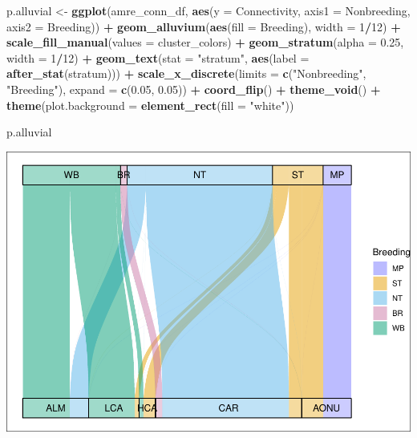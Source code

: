 \documentclass[
]{book}
\newenvironment{Shaded}{\begin{snugshade}}{\end{snugshade}}
\newcommand{\AttributeTok}[1]{\textcolor[rgb]{0.13,0.29,0.53}{#1}}
\newcommand{\DecValTok}[1]{\textcolor[rgb]{0.00,0.00,0.81}{#1}}
\newcommand{\FloatTok}[1]{\textcolor[rgb]{0.00,0.00,0.81}{#1}}
\newcommand{\FunctionTok}[1]{\textcolor[rgb]{0.13,0.29,0.53}{\textbf{#1}}}
\newcommand{\NormalTok}[1]{#1}
\newcommand{\OtherTok}[1]{\textcolor[rgb]{0.56,0.35,0.01}{#1}}
\newcommand{\SpecialCharTok}[1]{\textcolor[rgb]{0.81,0.36,0.00}{\textbf{#1}}}
\newcommand{\StringTok}[1]{\textcolor[rgb]{0.31,0.60,0.02}{#1}}
\begin{document}
\begin{Shaded}
\begin{Highlighting}[]
\NormalTok{p.alluvial }\OtherTok{\textless{}{-}} \FunctionTok{ggplot}\NormalTok{(amre\_conn\_df,}
       \FunctionTok{aes}\NormalTok{(}\AttributeTok{y =}\NormalTok{ Connectivity, }\AttributeTok{axis1 =}\NormalTok{ Nonbreeding, }\AttributeTok{axis2 =}\NormalTok{ Breeding)) }\SpecialCharTok{+}
  \FunctionTok{geom\_alluvium}\NormalTok{(}\FunctionTok{aes}\NormalTok{(}\AttributeTok{fill =}\NormalTok{ Breeding), }\AttributeTok{width =} \DecValTok{1}\SpecialCharTok{/}\DecValTok{12}\NormalTok{) }\SpecialCharTok{+}
  \FunctionTok{scale\_fill\_manual}\NormalTok{(}\AttributeTok{values =}\NormalTok{ cluster\_colors) }\SpecialCharTok{+}
  \FunctionTok{geom\_stratum}\NormalTok{(}\AttributeTok{alpha =} \FloatTok{0.25}\NormalTok{, }\AttributeTok{width =} \DecValTok{1}\SpecialCharTok{/}\DecValTok{12}\NormalTok{) }\SpecialCharTok{+}
  \FunctionTok{geom\_text}\NormalTok{(}\AttributeTok{stat =} \StringTok{"stratum"}\NormalTok{, }\FunctionTok{aes}\NormalTok{(}\AttributeTok{label =} \FunctionTok{after\_stat}\NormalTok{(stratum))) }\SpecialCharTok{+}
  \FunctionTok{scale\_x\_discrete}\NormalTok{(}\AttributeTok{limits =} \FunctionTok{c}\NormalTok{(}\StringTok{"Nonbreeding"}\NormalTok{, }\StringTok{"Breeding"}\NormalTok{),}
                   \AttributeTok{expand =} \FunctionTok{c}\NormalTok{(}\FloatTok{0.05}\NormalTok{, }\FloatTok{0.05}\NormalTok{)) }\SpecialCharTok{+} 
  \FunctionTok{coord\_flip}\NormalTok{() }\SpecialCharTok{+}
  \FunctionTok{theme\_void}\NormalTok{() }\SpecialCharTok{+}
  \FunctionTok{theme}\NormalTok{(}\AttributeTok{plot.background =} \FunctionTok{element\_rect}\NormalTok{(}\AttributeTok{fill =} \StringTok{"white"}\NormalTok{))}

\NormalTok{p.alluvial}
\end{Highlighting}
\end{Shaded}

\includegraphics{Mignette_files/figure-latex/unnamed-chunk-22-1.pdf}
\end{document}
